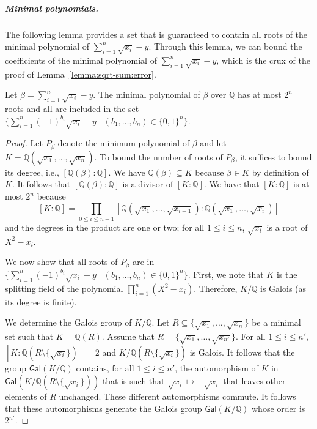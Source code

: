 \documentclass[a4paper,UKenglish,cleveref,autoref,thm-restate,colorlinks]{lipics-v2021}
\newcommand{\sqsx}{x} \newcommand{\sqsxVect}{\bar{x}} \newcommand{\sqsm}{m} \newcommand{\sqsy}{y} \newcommand{\sqsi}{i} \newcommand{\sqsn}{n} \newcommand{\sqsSize}{E}
\newcommand{\IQ}{\mathbb{Q}}
\begin{document}
\subparagraph*{Minimal polynomials.}
The following lemma provides a set that is guaranteed to contain all roots of the minimal polynomial of $\sum_{\sqsi=1}^\sqsn\sqrt{\sqsx_\sqsi}-\sqsy$.
Through this lemma, we can bound the coefficients of the minimal polynomial of $\sum_{\sqsi=1}^\sqsn\sqrt{\sqsx_\sqsi}-\sqsy$, which is the crux of the proof of Lemma~\ref{lemma:sqrt-sum:error}.

\begin{lemma}\label{lemma:sqrt-sum:roots}
  Let $\beta = \sum_{\sqsi=1}^\sqsn\sqrt{\sqsx_\sqsi} - \sqsy$.
  The minimal polynomial of $\beta$ over $\IQ$ has at most $2^\sqsn$ roots and all are included in the set $\{\sum_{\sqsi=1}^{\sqsn}(-1)^{b_\sqsi}\sqrt{\sqsx_\sqsi} - \sqsy\mid(b_1, \ldots, b_\sqsn)\in\{0, 1\}^\sqsn\}$.
\end{lemma}
\begin{proof}
  Let $P_\beta$ denote the minimum polynomial of $\beta$ and let $K = \IQ(\sqrt{\sqsx_1},\ldots, \sqrt{\sqsx_\sqsn})$.
  To bound the number of roots of $P_\beta$, it suffices to bound its degree, i.e., $[\IQ(\beta):\IQ]$.
  We have $\IQ(\beta)\subseteq K$ because $\beta\in K$ by definition of $K$.
  It follows that $[\IQ(\beta):\IQ]$ is a divisor of $[K:\IQ]$.
  We have that $[K:\IQ]$ is at most $2^\sqsn$ because
  \[[K:\IQ] = \prod_{0\leq\sqsi\leq\sqsn-1}[\IQ(\sqrt{\sqsx_1},\ldots, \sqrt{\sqsx_{\sqsi+1}}):\IQ(\sqrt{\sqsx_1},\ldots, \sqrt{\sqsx_\sqsi})]\]
  and the degrees in the product are one or two; for all $1\leq\sqsi\leq\sqsn$, $\sqrt{\sqsx_\sqsi}$ is a root of $X^2 - \sqsx_\sqsi$.

  We now show that all roots of $P_\beta$ are in $\{\sum_{\sqsi=1}^{\sqsn}(-1)^{b_\sqsi}\sqrt{\sqsx_\sqsi} - \sqsy\mid(b_1, \ldots, b_\sqsn)\in\{0, 1\}^\sqsn\}$.
  First, we note that $K$ is the splitting field of the polynomial $\prod_{\sqsi=1}^\sqsn (X^2 - \sqsx_\sqsi)$.
  Therefore, $K/\IQ$ is Galois (as its degree is finite).
  
  We determine the Galois group of $K/\IQ$.
  Let $R\subseteq\{\sqrt{\sqsx_1}, \ldots, \sqrt{\sqsx_\sqsn}\}$ be a minimal set such that $K = \IQ(R)$.
  Assume that $R = \{\sqrt{\sqsx_1}, \ldots, \sqrt{\sqsx_{\sqsn'}}\}$.
  For all $1\leq\sqsi\leq\sqsn'$, $[K:\IQ(R\setminus\{\sqrt{\sqsx_\sqsi}\})] = 2$ and $K/\IQ(R\setminus\{\sqrt{\sqsx_\sqsi}\})$ is Galois.
  It follows that the group $\mathsf{Gal}(K/\IQ)$ contains, for all $1\leq\sqsi\leq\sqsn'$, the automorphism of $K$ in $\mathsf{Gal}(K/\IQ(R\setminus\{\sqrt{\sqsx_\sqsi}\}))$ that is such that $\sqrt{\sqsx_\sqsi}\mapsto -\sqrt{\sqsx_\sqsi}$ that leaves other elements of $R$ unchanged.
    These different automorphisms commute.
    It follows that these automorphisms generate the Galois group $\mathsf{Gal}(K/\IQ)$ whose order is $2^{\sqsn'}$.


\end{proof}
\end{document}
